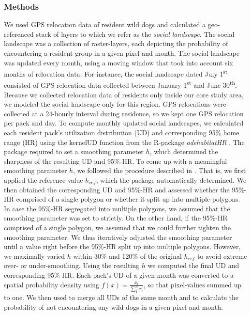\documentclass[abstract=on,10pt,a4paper,bibliography=totocnumbered]{scrartcl}
\begin{document}
\subsubsection{Methods}
We used GPS relocation data of resident wild dogs and calculated a
geo-referenced stack of layers to which we refer as the \textit{social
landscape}. The social landscape was a collection of raster-layers, each
depicting the probability of encountering a resident group in a given pixel and
month. The social landscape was updated every month, using a moving window that
took into account six months of relocation data. For instance, the social
landscape dated July 1\textsuperscript{st} consisted of GPS relocation data
collected between January 1\textsuperscript{st} and June 30\textsuperscript{th}.
Because we collected relocation data of residents only inside our core study
area, we modeled the social landscape only for this region. GPS relocations were
collected at a 24-hourly interval during residence, so we kept one GPS
relocation per pack and day. To compute monthly updated social landscapes, we
calculated each resident pack's utilization distribution (UD) and corresponding
95\% home range (HR) using the kernelUD function from the R-package
\textit{adehabitatHR} \citep{Calenge.2019}. The package required to set a
smoothing parameter \(h\), which determined the sharpness of the resulting UD
and 95\%-HR. To come up with a meaningful smoothing parameter \(h\), we followed
the procedure described in \cite{Cozzi.2018}. That is, we first applied the
reference value \( h_{ref} \), which the package automatically determined. We
then obtained the corresponding UD and 95\%-HR and assessed whether the 95\%-HR
comprised of a single polygon or whether it split up into multiple polygons. In
case the 95\%-HR segregated into multiple polygons, we assumed that the
smoothing parameter was set to strictly. On the other hand, if the 95\%-HR
comprised of a single polygon, we assumed that we could further tighten the
smoothing parameter. We thus iteratively adjusted the smoothing parameter until
a value right before the 95\%-HR split up into multiple polygons. However, we
maximally varied \( h \) within 30\% and 120\% of the original \( h_{ref} \) to
avoid extreme over- or under-smoothing. Using the resulting \(h\) we computed
the final UD and corresponding 95\%-HR. Each pack's UD of a given month was
converted to a spatial probability density using \(f(x) =
\frac{x_i}{\sum_1^n{x_i}}\), so that pixel-values summed up to one. We then used
 to merge all UDs of the same month and to calculate the probability
of not encountering any wild dogs in a given pixel and month.
\end{document}
